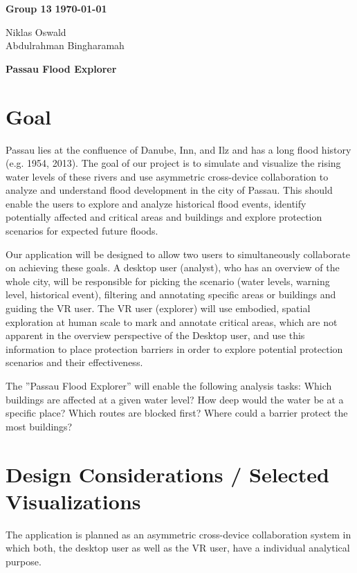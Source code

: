 \documentclass[a4paper,11pt]{article}
\begin{document}
\textbf{Group 13} \hfill \textbf{\today}

\vspace{0.5em}
Niklas Oswald\\
Abdulrahman Bingharamah

\vspace{1em}
\begin{center}
    \textbf{\large Passau Flood Explorer}
\end{center}

\section*{Goal}
Passau lies at the confluence of Danube, Inn, and Ilz and has a long flood history (e.g. 1954, 2013). The goal of our project is to simulate and visualize the rising water levels of these rivers and use asymmetric cross-device collaboration to analyze and understand flood development in the city of Passau. This should enable the users to explore and analyze historical flood events, identify potentially affected and critical areas and buildings and explore protection scenarios for expected future floods.

Our application will be designed to allow two users to simultaneously collaborate on achieving these goals. A desktop user (analyst), who has an overview of the whole city, will be responsible for picking the scenario (water levels, warning level, historical event), filtering and annotating specific areas or buildings and guiding the VR user. The VR user (explorer) will use embodied, spatial exploration at human scale to mark and annotate critical areas, which are not apparent in the overview perspective of the Desktop user, and use this information to place protection barriers in order to explore potential protection scenarios and their effectiveness.

The ''Passau Flood Explorer'' will enable the following analysis tasks: Which buildings are affected at a given water level? How deep would the water be at a specific place? Which routes are blocked first? Where could a barrier protect the most buildings?

\section*{Design Considerations / Selected Visualizations}
The application is planned as an asymmetric cross-device collaboration system in which both, the desktop user as well as the VR user, have a individual analytical purpose. 
\end{document}
